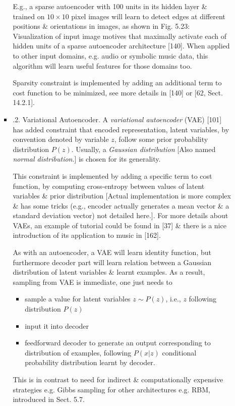 \documentclass{article}
\begin{document}
\begin{itemize}
\begin{itemize}
\begin{itemize}
			E.g., a sparse autoencoder with 100 units in its hidden layer \& trained on $10\times10$ pixel images will learn to detect edges at different positions \& orientations in images, as shown in {\sf Fig. 5.23: Visualization of input image motives that maximally activate each of hidden units of a sparse autoencoder architecture [140].} When applied to other input domains, e.g. audio or symbolic music data, this algorithm will learn useful features for those domains too.
			
			Sparsity constraint is implemented by adding an additional term to cost function to be minimized, see more details in [140] or [62, Sect. 14.2.1].
			\item {.2. Variational Autoencoder.} A {\it variational autoencoder} (VAE) [101] has added constraint that encoded representation, latent variables, by convention denoted by variable $z$, follow some prior probability distribution $P(z)$. Usually, a {\it Gaussian distribution} [Also named {\it normal distribution}.] is chosen for its generality.
			
			This constraint is implemented by adding a specific term to cost function, by computing cross-entropy between values of latent variables \& prior distribution [Actual implementation is more complex \& has some tricks (e.g., encoder actually generates a mean vector \& a standard deviation vector) not detailed here.]. For more details about VAEs, an example of tutorial could be found in [37] \& there is a nice introduction of its application to music in [162].
			
			As with an autoencoder, a VAE will learn identity function, but furthermore decoder part will learn relation between a Gaussian distribution of latent variables \& learnt examples. As a result, sampling from VAE is immediate, one just needs to
			\begin{itemize}
				\item sample a value for latent variables $z\sim P(z)$, i.e., $z$ following distribution $P(z)$
				\item input it into decoder
				\item feedforward decoder to generate an output corresponding to distribution of examples, following $P(x|z)$ conditional probability distribution learnt by decoder.
			\end{itemize}
			This is in contrast to need for indirect \& computationally expensive strategies e.g. Gibbs sampling for other architectures e.g. RBM, introduced in Sect. 5.7.
			

\end{itemize}
\end{itemize}
\end{itemize}
\end{document}
